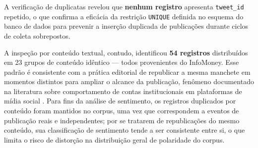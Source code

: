 A verificação de duplicatas revelou que \textbf{nenhum registro} apresenta \texttt{tweet\_id} repetido, o que confirma a eficácia da restrição \texttt{UNIQUE} definida no esquema do banco de dados para prevenir a inserção duplicada de publicações durante ciclos de coleta sobrepostos.


A inspeção por conteúdo textual, contudo, identificou \textbf{54 registros} distribuídos em 23 grupos de conteúdo idêntico --- todos provenientes do InfoMoney. Esse padrão é consistente com a prática editorial de republicar a mesma manchete em momentos distintos para ampliar o alcance da publicação, fenômeno documentado na literatura sobre comportamento de contas institucionais em plataformas de mídia social \cite{santana2024cap34}. Para fins da análise de sentimento, os registros duplicados por conteúdo foram mantidos no corpus, uma vez que correspondem a eventos de publicação reais e independentes; por se tratarem de republicações do mesmo conteúdo, sua classificação de sentimento tende a ser consistente entre si, o que limita o risco de distorção na distribuição geral de polaridade do corpus.
